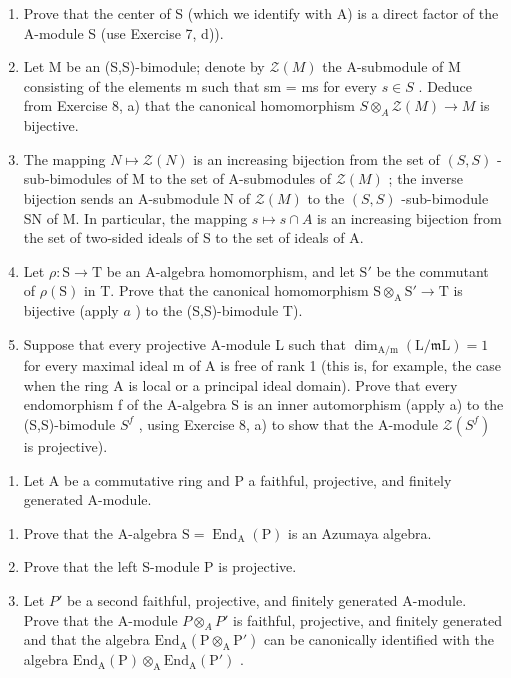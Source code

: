 \begin{enumerate}
\def\labelenumi{\alph{enumi})}
\item
  Prove that the center of S (which we identify with A) is a direct factor of the A-module S (use Exercise 7, d)).
\item
  Let M be an (S,S)-bimodule; denote by \(\mathcal{Z}(M)\) the A-submodule of M consisting of the elements m such that sm = ms for every \(s \in S\) . Deduce from Exercise 8, a) that the canonical homomorphism \(S \otimes_{A} \mathcal{Z}(M) \to M\) is bijective.
\item
  The mapping \(N \mapsto \mathcal{Z}(N)\) is an increasing bijection from the set of \((S, S)\) -sub-bimodules of M to the set of A-submodules of \(\mathcal{Z}(M)\) ; the inverse bijection sends an A-submodule N of \(\mathcal{Z}(M)\) to the \((S, S)\) -sub-bimodule SN of M. In particular, the mapping \(s \mapsto s \cap A\) is an increasing bijection from the set of two-sided ideals of S to the set of ideals of A.
\item
  Let \(\rho : \mathrm{S} \to \mathrm{T}\) be an A-algebra homomorphism, and let \(\mathrm{S}'\) be the commutant of \(\rho(\mathrm{S})\) in T. Prove that the canonical homomorphism \(\mathrm{S} \otimes_{\mathrm{A}} \mathrm{S}' \to \mathrm{T}\) is bijective (apply \(a\) ) to the (S,S)-bimodule T).
\item
  Suppose that every projective A-module L such that \(\dim_{\mathrm{A/m}}(\mathrm{L}/\mathfrak{m}\mathrm{L}) = 1\) for every maximal ideal m of A is free of rank 1 (this is, for example, the case when the ring A is local or a principal ideal domain). Prove that every endomorphism f of the A-algebra S is an inner automorphism (apply a) to the (S,S)-bimodule \(S^{f}\) , using Exercise 8, a) to show that the A-module \(\mathcal{Z}(S^{f})\) is projective).
\end{enumerate}

\begin{enumerate}
\def\labelenumi{\arabic{enumi})}
\setcounter{enumi}{9}
\tightlist
\item
  Let A be a commutative ring and P a faithful, projective, and finitely generated A-module.
\end{enumerate}

\begin{enumerate}
\def\labelenumi{\alph{enumi})}
\item
  Prove that the A-algebra \(\mathrm{S} = \operatorname{End}_{\mathrm{A}}(\mathrm{P})\) is an Azumaya algebra.
\item
  Prove that the left S-module P is projective.
\item
  Let \(P'\) be a second faithful, projective, and finitely generated A-module. Prove that the A-module \(P \otimes_{A} P'\) is faithful, projective, and finitely generated and that the algebra \(\text{End}_{\text{A}}(\text{P} \otimes_{\text{A}} \text{P}')\) can be canonically identified with the algebra \(\text{End}_{\text{A}}(\text{P}) \otimes_{\text{A}} \text{End}_{\text{A}}(\text{P}')\) .
\end{enumerate}

